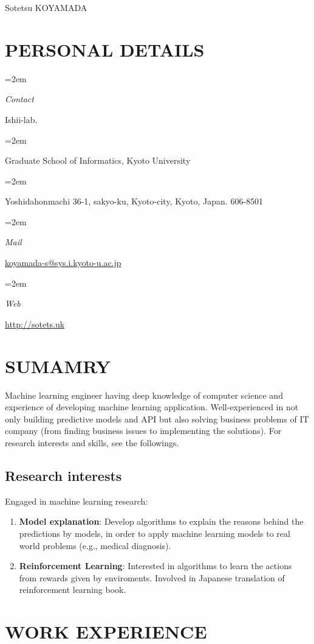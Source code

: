 \documentclass[paper=a4,fontsize=11pt]{scrartcl} %
\newlength{\spacebox}
\newcommand{\sepspace}{\vspace*{1em}}		%
\newcommand{\MyName}[1]{ %
		\Huge \usefont{OT1}{phv}{b}{n} \hfill #1
		\par \normalsize \normalfont}
\newcommand{\MySlogan}[1]{ %
		\large \usefont{OT1}{phv}{m}{n}\hfill \textit{#1}
		\par \normalsize \normalfont}
\newcommand{\NewPart}[1]{\section*{\uppercase{#1}}}
\newcommand{\PersonalEntry}[2]{
		\noindent\hangindent=2em\hangafter=0 %
		\parbox{\spacebox}{        %
		\textit{#1}}		       %
		\hspace{1.5em} #2 \par}    %
\begin{document}

\MyName{Sotetsu KOYAMADA}

\sepspace

\NewPart{Personal details}{}

\PersonalEntry{Contact}{Ishii-lab.}
\PersonalEntry{}{Graduate School of Informatics, Kyoto University}
\PersonalEntry{}{Yoshidahonmachi 36-1, sakyo-ku, Kyoto-city, Kyoto, Japan. 606-8501}
\PersonalEntry{Mail}{\url{koyamada-s@sys.i.kyoto-u.ac.jp}}
\PersonalEntry{Web}{\url{http://sotets.uk}}

\NewPart{Sumamry}{}

Machine learning engineer
having deep knowledge of computer science and
experience of developing machine learning application.
Well-experienced in not only building predictive models and API
but also solving business problems of IT company (from finding business issues to implementing the solutions).
For research interests and skills, see the followings.

\subsection*{Research interests}
Engaged in machine learning research:

\begin{enumerate}
  \item {\bf Model explanation}: Develop algorithms to explain the reasons behind the predictions by models, in order to apply machine learning models to real world problems (e.g., medical diagnosis).
	\item {\bf Reinforcement Learning}: Interested in algorithms to learn the actions from rewards given by enviroments. Involved in Japanese translation of reinforcement learning book.
\end{enumerate}

\NewPart{Work experience}{}
\end{document}
